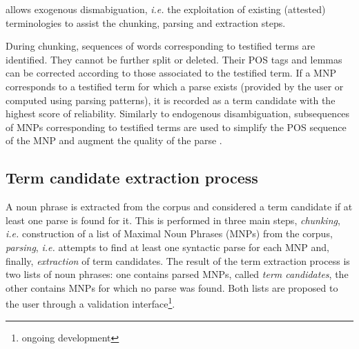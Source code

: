 
\YaTeA allows exogenous dismabiguation,  \textit{i.e.} the exploitation of existing (attested) terminologies to
assist the chunking, parsing and extraction steps. 

During chunking, sequences of words corresponding to testified terms
are identified. They cannot be further split or deleted. Their POS tags and
lemmas can be corrected according to those associated to the testified term. 
If a MNP corresponds to a testified term for which a parse exists
(provided by the user or computed using parsing patterns), it is
recorded as a term candidate with the highest score of reliability.
Similarly to endogenous disambiguation, subsequences of MNPs
corresponding to testified terms are used to simplify the POS sequence
of the MNP and augment the quality of the parse%
.
\subsection{Term candidate extraction process}\label{sec:term-extr-proc}
A noun phrase is extracted from the corpus and considered a term candidate if at least one
parse is found for it. This is performed in three main steps,
\emph{chunking}, \textit{i.e.} construction of a list of Maximal Noun
Phrases (MNPs) from the corpus, \emph{parsing}, \textit{i.e.} attempts
to find at least one syntactic parse for each MNP and, finally,
\emph{extraction} of term candidates.
The result of the term extraction process is two lists of noun phrases:  one
contains parsed MNPs, called \emph{term candidates}, the other
contains MNPs for which no parse was found. Both lists are proposed to
the user through a validation interface\footnote{ongoing development}.

